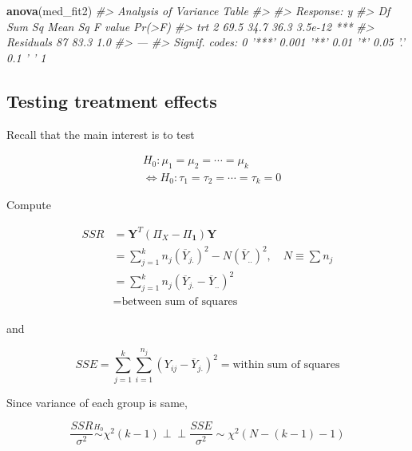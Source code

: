 \documentclass[]{book}
\newenvironment{Shaded}{\begin{snugshade}}{\end{snugshade}}
\newcommand{\CommentTok}[1]{\textcolor[rgb]{0.56,0.35,0.01}{\textit{#1}}}
\newcommand{\KeywordTok}[1]{\textcolor[rgb]{0.13,0.29,0.53}{\textbf{#1}}}
\newcommand{\NormalTok}[1]{#1}
\theoremstyle{definition}
\theoremstyle{definition}
\theoremstyle{definition}
\theoremstyle{remark}
\begin{document}
\begin{Shaded}
\begin{Highlighting}[]
\KeywordTok{anova}\NormalTok{(med_fit2)}
\CommentTok{#> Analysis of Variance Table}
\CommentTok{#> }
\CommentTok{#> Response: y}
\CommentTok{#>           Df Sum Sq Mean Sq F value  Pr(>F)    }
\CommentTok{#> trt        2   69.5    34.7    36.3 3.5e-12 ***}
\CommentTok{#> Residuals 87   83.3     1.0                    }
\CommentTok{#> ---}
\CommentTok{#> Signif. codes:  0 '***' 0.001 '**' 0.01 '*' 0.05 '.' 0.1 ' ' 1}
\end{Highlighting}
\end{Shaded}

\hypertarget{testing-treatment-effects}{%
\subsection{Testing treatment effects}\label{testing-treatment-effects}}

Recall that the main interest is to test

\[
\begin{aligned}
  & H_0: \mu_1 = \mu_2 = \cdots = \mu_k \\
  & \Leftrightarrow H_0: \tau_1 = \tau_2 = \cdots = \tau_k = 0
\end{aligned}
\]

Compute

\begin{equation}
  \begin{split}
    SSR & = \mathbf{Y}^T (\Pi_X - \Pi_{\mathbf{1}}) \mathbf{Y} \\
    & = \sum_{j = 1}^k n_j (\overline{Y}_{j.})^2 - N(\overline{Y}_{..})^2 , \quad N \equiv \sum n_j \\
    & = \sum_{j = 1}^k n_j (\overline{Y}_{j.} - \overline{Y}_{..})^2 \\
    & = \text{between sum of squares}
  \end{split}
  \label{eq:qualssr}
\end{equation}

and

\begin{equation}
  SSE = \sum_{j = 1}^k \sum_{i = 1}^{n_j} (Y_{ij} - \overline{Y}_{j.})^2 = \text{within sum of squares}
  \label{eq:qualsse}
\end{equation}

Since variance of each group is same,

\[\frac{SSR}{\sigma^2} \stackrel{H_0}{\sim}\chi^2(k - 1) \perp\!\!\!\perp\frac{SSE}{\sigma^2} \sim \chi^2(N - (k - 1) - 1)\]
\end{document}

